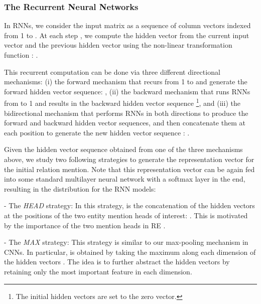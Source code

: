 \documentclass[11pt,letterpaper]{article}
\begin{document}
\subsubsection{The Recurrent Neural Networks}

\label{sec:rnn}

In RNNs, we consider the input matrix  as a sequence of column vectors indexed from 1 to . At each step , we compute the hidden vector  from the current input vector  and the previous hidden vector  using the non-linear transformation function : .

This recurrent computation can be done via three different directional mechanisms: (i) the forward mechanism that recurs from 1 to  and generate the forward hidden vector sequence: , (ii) the backward mechanism that runs RNNs from  to 1 and results in the backward hidden vector sequence \footnote{The initial hidden vectors are set to the zero vector.}, and (iii) the bidirectional mechanism that performs RNNs in both directions to produce the forward and backward hidden vector sequences, and then concatenate them at each position to generate the new hidden vector sequence : .



Given the hidden vector sequence  obtained from one of the three mechanisms above, we study two following strategies to generate the representation vector  for the initial relation mention. Note that this representation vector can be again fed into some standard multilayer neural network with a softmax layer in the end, resulting in the distribution  for the RNN models:

- The {\it HEAD} strategy: In this strategy,  is the concatenation of the hidden vectors at the positions of the two entity mention heads of interest: . This is motivated by the importance of the two mention heads in RE \cite{Sun:11,Nguyen:14}.



- The {\it MAX} strategy: This strategy is similar to our max-pooling mechanism in CNNs. In particular,  is obtained by taking the maximum along each dimension of the hidden vectors . The idea is to further abstract the hidden vectors by retaining only the most important feature in each dimension.
\end{document}
